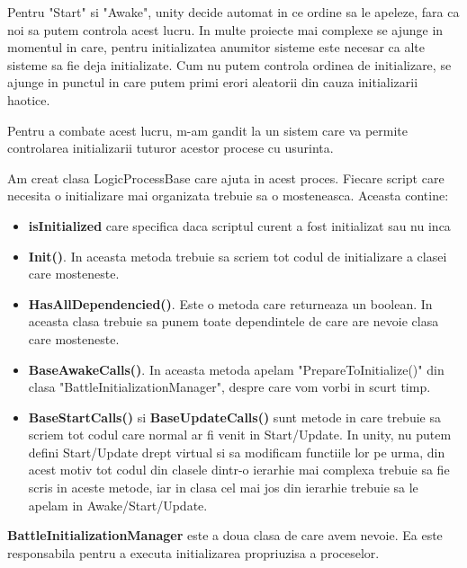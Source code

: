 \documentclass[12pt, a4paper]{article}
\begin{document}
	Pentru "Start" si "Awake", unity decide automat in ce ordine sa le apeleze, fara ca noi sa putem controla acest lucru. In multe proiecte mai complexe se ajunge in momentul in care, pentru initializatea anumitor sisteme este necesar ca alte sisteme sa fie deja initializate. Cum nu putem controla ordinea de initializare, se ajunge in punctul in care putem primi erori aleatorii din cauza initializarii haotice.
	
	Pentru a combate acest lucru, m-am gandit la un sistem care va permite controlarea initializarii tuturor acestor procese cu usurinta.
	
	
	Am creat clasa LogicProcessBase care ajuta in acest proces. Fiecare script care necesita o initializare mai organizata trebuie sa o mosteneasca. Aceasta contine:
	\begin{itemize}
		\item \textbf{isInitialized} care specifica daca scriptul curent a fost initializat sau nu inca
		\item \textbf{Init()}. In aceasta metoda trebuie sa scriem tot codul de initializare a clasei care mosteneste.
		\item \textbf{HasAllDependencied()}. Este o metoda care returneaza un boolean. In aceasta clasa trebuie sa punem toate dependintele de care are nevoie clasa care mosteneste.
		\item \textbf{BaseAwakeCalls()}. In aceasta metoda apelam "PrepareToInitialize()" din clasa "BattleInitializationManager", despre care vom vorbi in scurt timp.
		\item \textbf{BaseStartCalls()} si \textbf{BaseUpdateCalls()} sunt metode in care trebuie sa scriem tot codul care normal ar fi venit in Start/Update. In unity, nu putem defini Start/Update drept virtual si sa modificam functiile lor pe urma, din acest motiv tot codul din clasele dintr-o ierarhie mai complexa trebuie sa fie scris in aceste metode, iar in clasa cel mai jos din ierarhie trebuie sa le apelam in Awake/Start/Update.
	\end{itemize}

	\textbf{BattleInitializationManager} este a doua clasa de care avem nevoie. Ea este responsabila pentru a executa initializarea propriuzisa a proceselor. 
	
\end{document}
